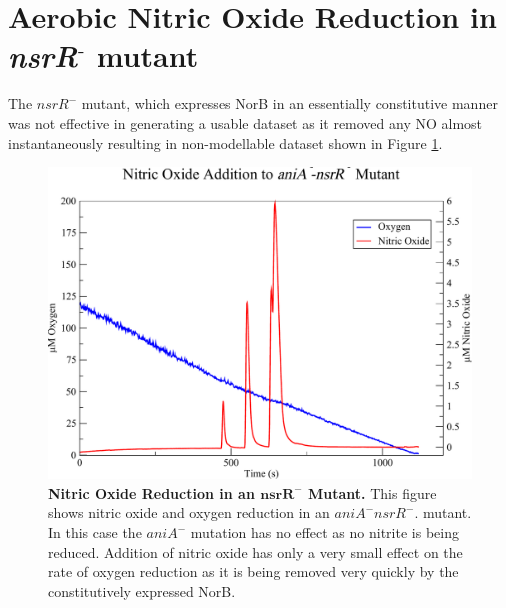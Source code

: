 \section{\texorpdfstring{Aerobic Nitric Oxide Reduction in \textit{nsrR$^\textrm{-}$} mutant}{Aerobic Nitric Oxide Reduction in nsrR- mutant}}
 The $\mathit{nsrR}^-$ mutant, which expresses NorB in an essentially constitutive manner was not effective in generating a usable dataset as it removed any NO almost instantaneously resulting in non-modellable dataset shown in Figure \ref{fig:aniAnsrR}.
\begin{figure}[tbp]
 \centering
 \includegraphics[width=15cm, clip=true]{./06-noreduction/data/aniA-nsrR.pdf}
 \caption[{Nitric Oxide Reduction in an nsrR Mutant.}]{{\bf Nitric Oxide Reduction in an $\mathbf{nsrR}^-$ Mutant.} This figure shows nitric oxide and oxygen reduction in an $aniA^-nsrR^-$. mutant. In this case the $aniA^-$ mutation has no effect as no nitrite is being reduced. Addition of nitric oxide has only a very small effect on the rate of oxygen reduction as it is being removed very quickly by the constitutively expressed NorB.}
 \label{fig:aniAnsrR}
\end{figure}

